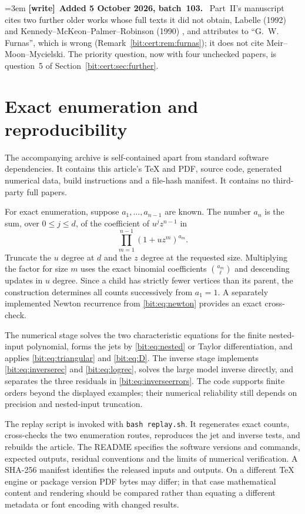 \documentclass[11pt]{article}
\theoremstyle{definition}\newtheorem{definition}[theorem]{Definition}
\theoremstyle{remark}\newtheorem{remark}[theorem]{Remark}
\newenvironment{writenote}[1][]{\par\smallskip\begingroup\small\emergencystretch=3em
 \noindent\textbf{[write]}\if\relax\detokenize{#1}\relax\else~\textbf{#1.}\fi\ }%
 {\par\endgroup\smallskip}
\begin{document}
\begin{writenote}[Added 5 October 2026, batch~103]
Part~II's manuscript cites two further older works whose full texts it did
not obtain, Labelle (1992) \cite{labelle} and Kennedy--McKeon--Palmer--Robinson
(1990) \cite{kmpr}, and attributes \cite{hkq} to ``G.~W. Furnas'', which is
wrong (Remark~\ref{bit:cert:rem:furnas}); it does not cite
Meir--Moon--Mycielski. The priority question, now with four unchecked papers,
is question~5 of Section~\ref{bit:cert:sec:further}.
\end{writenote}

\section{Exact enumeration and reproducibility}
\label{bit:sec:reproduce}
The accompanying archive is self-contained apart from standard software dependencies. It contains this article's TeX and PDF, source code, generated numerical data, build instructions and a file-hash manifest. It contains no third-party full papers.

For exact enumeration, suppose $a_1,\ldots,a_{n-1}$ are known. The number $a_n$ is the sum, over $0\le j\le d$, of the coefficient of $u^jz^{n-1}$ in
\begin{equation}
 \prod_{m=1}^{n-1}(1+uz^m)^{a_m}.
 \label{bit:eq:enumeration}
\end{equation}
Truncate the $u$ degree at $d$ and the $z$ degree at the requested size. Multiplying the factor for size $m$ uses the exact binomial coefficients $\binom{a_m}{\ell}$ and descending updates in $u$ degree. Since a child has strictly fewer vertices than its parent, the construction determines all counts successively from $a_1=1$. A separately implemented Newton recurrence from \eqref{bit:eq:newton} provides an exact cross-check.

The numerical stage solves the two characteristic equations for the finite nested-input polynomial, forms the jets by \eqref{bit:eq:nested} or Taylor differentiation, and applies \eqref{bit:eq:triangular} and \eqref{bit:eq:D}. The inverse stage implements \eqref{bit:eq:inverserec} and \eqref{bit:eq:logrec}, solves the large model inverse directly, and separates the three residuals in \eqref{bit:eq:inverseerrors}. The code supports finite orders beyond the displayed examples; their numerical reliability still depends on precision and nested-input truncation.

The replay script is invoked with \texttt{bash replay.sh}. It regenerates exact counts, cross-checks the two enumeration routes, reproduces the jet and inverse tests, and rebuilds the article. The README specifies the software versions and commands, expected outputs, residual conventions and the limits of numerical verification. A SHA-256 manifest identifies the released inputs and outputs. On a different TeX engine or package version PDF bytes may differ; in that case mathematical content and rendering should be compared rather than equating a different metadata or font encoding with changed results.
\end{document}
